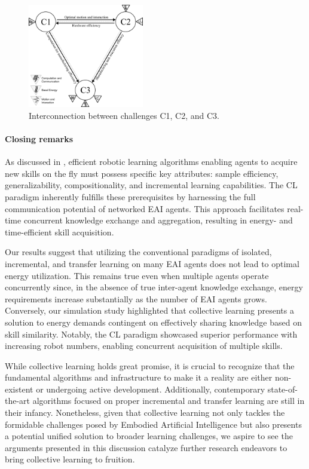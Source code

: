 \documentclass[12pt]{article}
\begin{document}
\begin{figure}[!t]
	\centering
	\includegraphics[width=0.45\textwidth]{fig/grand_challenges_connections.png}
	\caption{Interconnection between challenges C1, C2, and C3.}
	\label{fig:challengesConnected}
\end{figure}

\paragraph*{Closing remarks}
As discussed in \cite{Kaelbling2020foundationefficientrobot}, efficient robotic learning algorithms enabling agents to acquire new skills on the fly must possess specific key attributes: sample efficiency, generalizability, compositionality, and incremental learning capabilities. The CL paradigm inherently fulfills these prerequisites by harnessing the full communication potential of networked EAI agents. This approach facilitates real-time concurrent knowledge exchange and aggregation, resulting in energy- and time-efficient skill acquisition.

Our results suggest that utilizing the conventional paradigms of isolated, incremental, and transfer learning on many EAI agents does not lead to optimal energy utilization. This remains true even when multiple agents operate concurrently since, in the absence of true inter-agent knowledge exchange, energy requirements increase substantially as the number of EAI agents grows. Conversely, our simulation study highlighted that collective learning presents a solution to energy demands contingent on effectively sharing knowledge based on skill similarity. Notably, the CL paradigm showcased superior performance with increasing robot numbers, enabling concurrent acquisition of multiple skills.

While collective learning holds great promise, it is crucial to recognize that the fundamental algorithms and infrastructure to make it a reality are either non-existent or undergoing active development. Additionally, contemporary state-of-the-art algorithms focused on proper incremental and transfer learning are still in their infancy. Nonetheless, given that collective learning not only tackles the formidable challenges posed by Embodied Artificial Intelligence but also presents a potential unified solution to broader learning challenges, we aspire to see the arguments presented in this discussion catalyze further research endeavors to bring collective learning to fruition.
\end{document}
